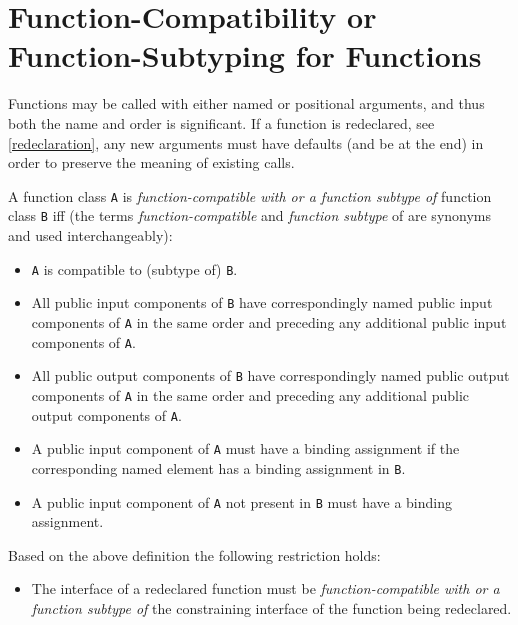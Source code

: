 \section{Function-Compatibility or Function-Subtyping for Functions}

\begin{nonnormative}
Functions may be called with either named or positional
arguments, and thus both the name and order is significant. If a
function is redeclared, see \autoref{redeclaration}, any new arguments must
have defaults (and be at the end) in order to preserve the meaning of
existing calls.
\end{nonnormative}

\begin{definition}
A function class \lstinline!A! is \emph{function-compatible with or a function
subtype of} function class \lstinline!B! iff (the terms \emph{function-compatible}
and \emph{function subtype} of are synonyms and used interchangeably):
\begin{itemize}
\item
  \lstinline!A! is compatible to (subtype of) \lstinline!B!.
\item
  All public input components of \lstinline!B! have correspondingly named public
  input components of \lstinline!A! in the same order and preceding any additional
  public input components of \lstinline!A!.
\item
  All public output components of \lstinline!B! have correspondingly named public
  output components of \lstinline!A! in the same order and preceding any additional
  public output components of \lstinline!A!.
\item
  A public input component of \lstinline!A! must have a binding assignment if the
  corresponding named element has a binding assignment in \lstinline!B!.
\item
  A public input component of \lstinline!A! not present in \lstinline!B! must have a binding
  assignment.
\end{itemize}
\end{definition}

Based on the above definition the following restriction holds:
\begin{itemize}
\item
  The interface of a redeclared function must be
  \emph{function-compatible with or a function subtype of} the
  constraining interface of the function being redeclared.
\end{itemize}

